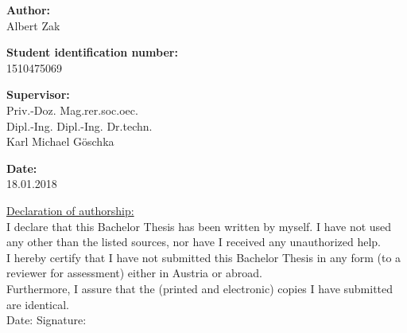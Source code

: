\begin{center}
  \vspace{2cm}

  \hspace*{-1.0cm} \textbf{Author:} \\
  \vspace{0.2cm}
  \hspace*{-1.0cm} Albert Zak \\
  \vspace{0.7cm}

  \hspace*{-1.0cm} \textbf{Student identification number:}  \\
  \vspace{0.2cm}
  \hspace*{-1.0cm} 1510475069 \\
  \vspace{0.7cm}

  \hspace*{-1.0cm} \textbf{Supervisor:} \\
  \vspace{0.2cm}
  \hspace*{-1.0cm} Priv.-Doz. Mag.rer.soc.oec.\\
  \hspace*{-1.0cm} Dipl.-Ing. Dipl.-Ing. Dr.techn.\\
  \hspace*{-1.0cm} Karl Michael Göschka \\
  \vspace{0.7cm}

  \hspace*{-1.0cm} \textbf{Date:} \\
  \vspace{0.2cm}
  \hspace*{-1.0cm} 18.01.2018 \\

\end{center}

\newpage

\vspace*{16cm}
\begin{flushleft}
  \underline{Declaration of authorship:}\\
  \vspace{0.5cm}
  I declare that this Bachelor Thesis has been written by myself. I have not used any other than the listed sources, nor have I received any unauthorized help.\\
  \vspace{0.5cm}
  I hereby certify that I have not submitted this Bachelor Thesis in any form (to a reviewer for assessment) either in Austria or abroad.\\
  \vspace{0.5cm}
  Furthermore, I assure that the (printed and electronic) copies I have submitted are identical.\\
  \vspace{1cm}
  Date: \hspace{5.3cm} Signature:
\end{flushleft}
